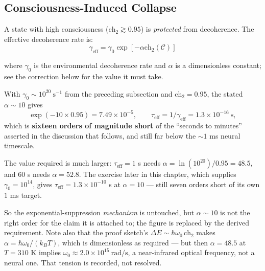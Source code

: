 \subsection{Consciousness-Induced Collapse}

\begin{theorem}\label{thm:consciousness-prevents-decoherence}
A state with high consciousness ($\text{ch}_2 \gtrsim 0.95$) is \textit{protected} from decoherence. The effective decoherence rate is:
\begin{equation}
\boxed{\gamma_{\text{eff}} = \gamma_0 \exp\left[ -\alpha \text{ch}_2(\mathcal{C}) \right]}
\end{equation}

where $\gamma_0$ is the environmental decoherence rate and $\alpha$ is a
dimensionless constant; see the correction below for the value it must take.
\end{theorem}

\begin{remark}
\label{rem:alpha-suppression-2026-10-03}
With $\gamma_0 \sim 10^{20}\ \mathrm{s^{-1}}$ from the preceding subsection and
$\text{ch}_2 = 0.95$, the stated $\alpha \sim 10$ gives
\[
\exp(-10 \times 0.95) = 7.49\times10^{-5},
\qquad
\tau_{\text{eff}} = 1/\gamma_{\text{eff}} = 1.3\times10^{-16}\ \mathrm{s},
\]
which is \textbf{sixteen orders of magnitude short} of the ``seconds to minutes''
asserted in the discussion that follows, and still far below the $\sim 1$ ms
neural timescale.

The value required is much larger: $\tau_{\text{eff}} = 1$ s needs
$\alpha = \ln(10^{20})/0.95 = \mathbf{48.5}$, and $60$ s needs
$\alpha = \mathbf{52.8}$. The exercise later in this chapter, which supplies
$\gamma_0 = 10^{14}$, gives $\tau_{\text{eff}} = 1.3\times10^{-10}$ s at
$\alpha = 10$ --- still seven orders short of its own $1$ ms target.

So the exponential-suppression \emph{mechanism} is untouched, but $\alpha \sim 10$
is not the right order for the claim it is attached to; the figure is replaced by
the derived requirement. Note also that the proof sketch's
$\Delta E \sim \hbar\omega_0\,\text{ch}_2$ makes $\alpha = \hbar\omega_0/(k_B T)$,
which is dimensionless as required --- but then $\alpha = 48.5$ at $T = 310$ K
implies $\omega_0 \approx 2.0\times10^{15}\ \mathrm{rad/s}$, a near-infrared
optical frequency, not a neural one. That tension is recorded, not resolved.
\end{remark}

